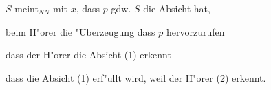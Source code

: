 \documentclass[emulatestandardclasses]{scrartcl}
\begin{document}
\noindent $S$ meint$_{NN}$ mit $x$, dass $p$ gdw. $S$ die Absicht hat, 

\begin{description}[leftmargin=!,labelwidth=\widthof{\bfseries 3}]
    \item[1] beim H"orer die "Uberzeugung dass $p$ hervorzurufen
    \item[2] dass der H"orer die Absicht (1) erkennt
    \item[3] dass die Absicht (1) erf"ullt wird, weil der H"orer (2) erkennt.
\end{description}

\newpage
%
%

\end{document}
